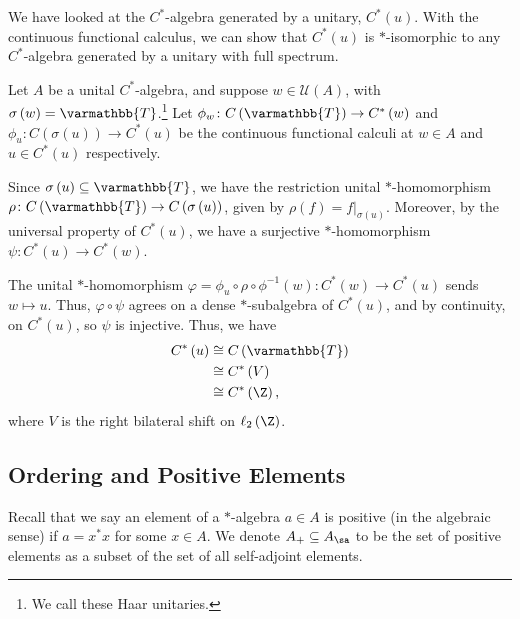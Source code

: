 \documentclass[10pt]{mypackage}
\renewcommand*{\mathbb}[1]{\varmathbb{#1}}
\newcommand{\T}{\mathbb{T}}
\begin{document}
\begin{example}
  We have looked at the $C^{\ast}$-algebra generated by a unitary, $C^{\ast}\left(u\right)$. With the continuous functional calculus, we can show that $C^{\ast}\left(u\right)$ is $\ast$-isomorphic to any $C^{\ast}$-algebra generated by a unitary with full spectrum.\newline

  Let $A$ be a unital $C^{\ast}$-algebra, and suppose $w\in \mathcal{U}\left(A\right)$, with $\sigma\left(w\right) = \T$.\footnote{We call these Haar unitaries.} Let $\phi_w\colon C\left(\T\right)\rightarrow C^{\ast}\left(w\right)$ and $\phi_u\colon C\left(\sigma\left(u\right)\right)\rightarrow C^{\ast}\left(u\right)$ be the continuous functional calculi at $w\in A$ and $u\in C^{\ast}\left(u\right)$ respectively.\newline

  Since $\sigma\left(u\right)\subseteq \T$, we have the restriction unital $\ast$-homomorphism $\rho\colon C\left(\T\right)\rightarrow C\left(\sigma\left(u\right)\right)$, given by $\rho\left(f\right) = f|_{\sigma\left(u\right)}$. Moreover, by the universal property of $C^{\ast}\left(u\right)$, we have a surjective $\ast$-homomorphism $\psi\colon C^{\ast}\left(u\right)\rightarrow C^{\ast}\left(w\right)$.\newline

  The unital $\ast$-homomorphism $\varphi = \phi_u\circ \rho \circ \phi^{-1}(w)\colon C^{\ast}\left(w\right)\rightarrow C^{\ast}\left(u\right)$ sends $w\mapsto u$. Thus, $\varphi\circ \psi$ agrees on a dense $\ast$-subalgebra of $C^{\ast}\left(u\right)$, and by continuity, on $C^{\ast}\left(u\right)$, so $\psi$ is injective. Thus, we have
  \begin{align*}
    C^{\ast}\left(u\right) &\cong C\left(\T\right)\\
                           &\cong C^{\ast}\left(V\right)\\
                           &\cong C^{\ast}\left(\Z\right),
  \end{align*}
  where $V$ is the right bilateral shift on $\ell_{2}\left(\Z\right)$.
\end{example}
\subsection{Ordering and Positive Elements}%
Recall that we say an element of a $\ast$-algebra $a\in A$ is positive (in the algebraic sense) if $a = x^{\ast}x$ for some $x\in A$. We denote $A_{+}\subseteq A_{\sa}$ to be the set of positive elements as a subset of the set of all self-adjoint elements.\newline
\end{document}
